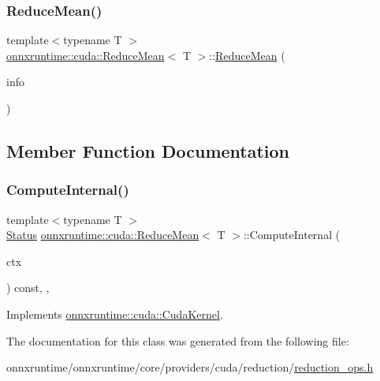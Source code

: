 \subsubsection{\texorpdfstring{Reduce\+Mean()}{ReduceMean()}}
{\footnotesize\ttfamily template$<$typename T $>$ \\
\mbox{\hyperlink{classonnxruntime_1_1cuda_1_1ReduceMean}{onnxruntime\+::cuda\+::\+Reduce\+Mean}}$<$ T $>$\+::\mbox{\hyperlink{classonnxruntime_1_1cuda_1_1ReduceMean}{Reduce\+Mean}} (\begin{DoxyParamCaption}\item[{const \mbox{\hyperlink{classonnxruntime_1_1OpKernelInfo}{Op\+Kernel\+Info}} \&}]{info }\end{DoxyParamCaption})\hspace{0.3cm}{\ttfamily [inline]}}



\subsection{Member Function Documentation}
\mbox{\label{classonnxruntime_1_1cuda_1_1ReduceMean_a8a8901b51c3f9861ae02318744b246af}} 
\subsubsection{\texorpdfstring{Compute\+Internal()}{ComputeInternal()}}
{\footnotesize\ttfamily template$<$typename T $>$ \\
\mbox{\hyperlink{classonnxruntime_1_1common_1_1Status}{Status}} \mbox{\hyperlink{classonnxruntime_1_1cuda_1_1ReduceMean}{onnxruntime\+::cuda\+::\+Reduce\+Mean}}$<$ T $>$\+::Compute\+Internal (\begin{DoxyParamCaption}\item[{\mbox{\hyperlink{classonnxruntime_1_1OpKernelContext}{Op\+Kernel\+Context}} $\ast$}]{ctx }\end{DoxyParamCaption}) const\hspace{0.3cm}{\ttfamily [inline]}, {\ttfamily [override]}, {\ttfamily [virtual]}}



Implements \mbox{\hyperlink{classonnxruntime_1_1cuda_1_1CudaKernel_aca7af04ae448017d6023d30bba231ebb}{onnxruntime\+::cuda\+::\+Cuda\+Kernel}}.



The documentation for this class was generated from the following file\+:\begin{DoxyCompactItemize}
\item 
onnxruntime/onnxruntime/core/providers/cuda/reduction/\mbox{\hyperlink{cuda_2reduction_2reduction__ops_8h}{reduction\+\_\+ops.\+h}}\end{DoxyCompactItemize}
